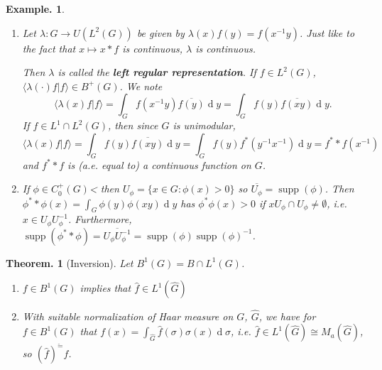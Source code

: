 \documentclass[11pt, a4paper]{memoir}
\theoremstyle{change}
\newtheorem{theorem}{Theorem.}[section]
\theoremstyle{plain}
\theoremstyle{nonumberplain}
\newtheorem{example}{Example.}
\DeclareMathOperator{\supp}{supp}
\renewcommand{\d}[1]{\ensuremath{\operatorname{d}\!{#1}}}
\newcommand{\defn}[1]{{\boldmath\bfseries #1}}
\numberwithin{equation}{section}
\begin{document}
\begin{example}
    \begin{enumerate}[r]
        \item Let $\lambda:G\to U(L^2(G))$ be given by $\lambda(x)f(y)=f(x^{-1}y)$.
            Just like to the fact that $x\mapsto x*f$ is continuous, $\lambda$ is continuous.

            Then $\lambda$ is called the \defn{left regular representation}.
            If $f\in L^2(G)$, $\langle\lambda(\cdot)f|f\rangle\in B^+(G)$.
            We note
            \begin{equation*}
                \langle\lambda(x)f|f\rangle=\int_G f(x^{-1}y)\overline{f(y)}\d{y}=\int_Gf(y)\overline{f(xy)}\d{y}.
            \end{equation*}
            If $f\in L^1\cap L^2(G)$, then since $G$ is unimodular,
            \begin{equation*}
                \langle\lambda(x)f|f\rangle=\int_Gf(y)\overline{f(xy)}\d{y}=\int_Gf(y)f^*(y^{-1}x^{-1})\d{y}=f^**f(x^{-1})
            \end{equation*}
            and $f^**f$ is (a.e. equal to) a continuous function on $G$.
        \item If $\phi\in C_0^+(G)$< then $U_\phi=\{x\in G:\phi(x)>0\}$ so $\overline{U_\phi}=\supp(\phi)$.
            Then $\phi^**\phi(x)=\int_G\phi(y)\phi(xy)\d{y}$ has $\phi^*\phi(x)>0$ if $xU_\phi\cap U_\phi\neq\emptyset$, i.e. $x\in U_\phi U_\phi^{-1}$.
            Furthermore, $\supp(\phi^**\phi)=\overline{U_\phi U_\phi^{-1}}=\supp(\phi)\supp(\phi)^{-1}$.
    \end{enumerate}
\end{example}
\begin{theorem}[Inversion]
    Let $B^1(G)=B\cap L^1(G)$.
    \begin{enumerate}[nl,r]
        \item $f\in B^1(G)$ implies that $\hat{f}\in L^1(\widehat{G})$
        \item With suitable normalization of Haar measure on $G$, $\widehat{G}$, we have for $f\in B^1(G)$ that $f(x)=\int_{\widehat{G}}\hat{f}(\sigma)\sigma(x)\d{\sigma}$, i.e. $\hat{f}\in L^1(\widehat{G})\cong M_a(\widehat{G})$, so $(\hat{f})^\check=f$.
    \end{enumerate}
\end{theorem}
\end{document}
